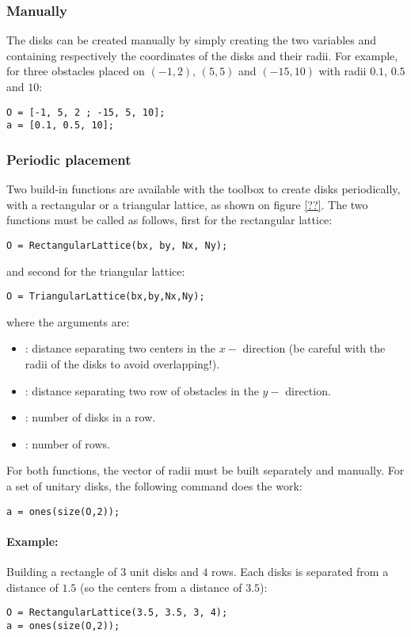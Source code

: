 \subsubsection{Manually}

The disks can be created manually by simply creating the two variables  and  containing respectively the coordinates of the disks and their radii. For example, for three obstacles placed on $(-1,2)$, $(5,5)$ and $(-15,10)$ with radii $0.1$, $0.5$ and $10$:
\begin{verbatim}
O = [-1, 5, 2 ; -15, 5, 10];
a = [0.1, 0.5, 10];
\end{verbatim}

\subsubsection{Periodic placement}

Two build-in functions are available with the toolbox to create disks periodically, with a rectangular or a triangular lattice, as shown on figure \ref{??}. The two functions must be called as follows, first for the rectangular lattice:
\begin{verbatim}
O = RectangularLattice(bx, by, Nx, Ny);
\end{verbatim}
and second for the triangular lattice:
\begin{verbatim}
O = TriangularLattice(bx,by,Nx,Ny);
\end{verbatim}
where the arguments are:
\begin{itemize}
\item {}: distance separating two centers in the $x-$ direction (be careful with the radii of the disks to avoid overlapping!).
\item {}: distance separating two row of obstacles in the $y-$ direction.
\item {}: number of disks in a row.
\item {}: number of rows.
\end{itemize}
For both functions, the vector of radii must be built separately and manually. For a set of unitary disks, the following command does the work:
\begin{verbatim}
a = ones(size(O,2));
\end{verbatim}

\paragraph{Example:} Building a rectangle of $3$ unit disks and $4$ rows. Each disks is separated from a distance of $1.5$ (so the centers from a distance of $3.5$):
\begin{verbatim}
O = RectangularLattice(3.5, 3.5, 3, 4);
a = ones(size(O,2));
\end{verbatim}



